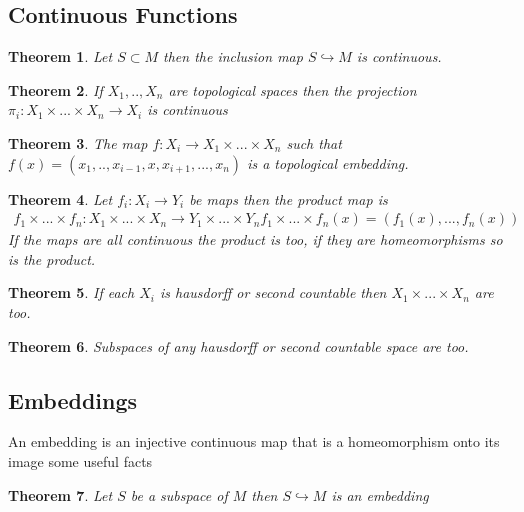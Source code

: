 \documentclass[11pt]{book}
\newtheorem{theorem}{Theorem}[section]
\begin{document}
	\subsection{Continuous Functions}
	\begin{theorem}
		Let $S \subset M$ then the inclusion map $S \hookrightarrow M$ is continuous.
	\end{theorem}
	
	\begin{theorem}
		If $X_1,..,X_n$ are topological spaces then the projection $\pi_i: X_1 \times ... \times X_n \rightarrow X_i$ is continuous
	\end{theorem}
	
	\begin{theorem}
		The map $f: X_i \rightarrow X_1 \times ... \times X_n$ such that $f(x) = (x_1,..,x_{i-1},x,x_{i+1}, ... , x_n)$ is a topological 
		embedding.
	\end{theorem}
	
	\begin{theorem}
		Let $f_i: X_i \rightarrow Y_i$ be maps then the product map is 
		\begin{align*}
			f_1 \times ... \times f_n: X_1 \times ... \times X_n \rightarrow Y_1 \times ... \times Y_n
			f_1 \times ... \times f_n (x) = (f_1(x), ..., f_n(x))
		\end{align*}
		If the maps are all continuous the product is too, if they are homeomorphisms so is the product.
	\end{theorem}
	
	\begin{theorem}
		If each $X_i$ is hausdorff or second countable then $X_1 \times ... \times X_n$ are too.
	\end{theorem}
	
	\begin{theorem}
		Subspaces of any hausdorff or second countable space are too. 
	\end{theorem}
	
	
	\subsection{Embeddings}
	An embedding is an injective continuous map that is a homeomorphism onto its image some useful facts
	
	\begin{theorem}
		Let $S$ be a subspace of $M$ then $S \hookrightarrow M$ is an embedding
	\end{theorem}
	
\end{document}
